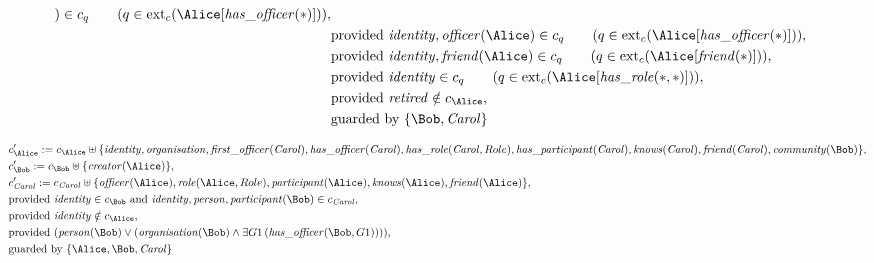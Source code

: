 \begin{align*}
)
 \in c_
q
 \qquad (
q \in 
\mathrm{ext}_c(
\Alice
[
\mathit{\detokenize{
has_officer
}}
(
\ast
)
]
)
)
,\\
&
\text{provided } 
\mathit{\detokenize{
identity
}}
,
\mathit{\detokenize{
officer
}}
(
\Alice
)
 \in c_
q
 \qquad (
q \in 
\mathrm{ext}_c(
\Alice
[
\mathit{\detokenize{
has_officer
}}
(
\ast
)
]
)
)
,\\
&
\text{provided } 
\mathit{\detokenize{
identity
}}
,
\mathit{\detokenize{
friend
}}
(
\Alice
)
 \in c_
q
 \qquad (
q \in 
\mathrm{ext}_c(
\Alice
[
\mathit{\detokenize{
friend
}}
(
\ast
)
]
)
)
,\\
&
\text{provided } 
\mathit{\detokenize{
identity
}}
 \in c_
q
 \qquad (
q \in 
\mathrm{ext}_c(
\Alice
[
\mathit{\detokenize{
has_role
}}
(
\ast
,
\ast
)
]
)
)
,\\
&
\text{provided } 
\mathit{\detokenize{
retired
}}
 \notin c_
{
\Alice
}
,\\
&
\text{guarded by } \{
\Bob
,
\mathit{Carol}
\}
\end{align*}

\begin{align*}
&
c'_
{
\Alice
}
 := 
c_
{
\Alice
}
 \uplus 
\{
\mathit{\detokenize{
identity
}}
,
\mathit{\detokenize{
organisation
}}
,
\mathit{\detokenize{
first_officer
}}
(
\mathit{Carol}
)
,
\mathit{\detokenize{
has_officer
}}
(
\mathit{Carol}
)
,
\mathit{\detokenize{
has_role
}}
(
\mathit{Carol}
,
Role
)
,
\mathit{\detokenize{
has_participant
}}
(
\mathit{Carol}
)
,
\mathit{\detokenize{
knows
}}
(
\mathit{Carol}
)
,
\mathit{\detokenize{
friend
}}
(
\mathit{Carol}
)
,
\mathit{\detokenize{
community
}}
(
\Bob
)
\}
,\\
&
c'_
{
\Bob
}
 := 
c_
{
\Bob
}
 \uplus 
\{
\mathit{\detokenize{
creator
}}
(
\Alice
)
\}
,\\
&
c'_
{
\mathit{Carol}
}
 := 
c_
{
\mathit{Carol}
}
 \uplus 
\{
\mathit{\detokenize{
officer
}}
(
\Alice
)
,
\mathit{\detokenize{
role
}}
(
\Alice
,
Role
)
,
\mathit{\detokenize{
participant
}}
(
\Alice
)
,
\mathit{\detokenize{
knows
}}
(
\Alice
)
,
\mathit{\detokenize{
friend
}}
(
\Alice
)
\}
,\\
&
\text{provided } 
\mathit{\detokenize{
identity
}}
 \in c_
{
\Bob
}
 \text{ and } 
\mathit{\detokenize{
identity
}}
,
\mathit{\detokenize{
person
}}
,
\mathit{\detokenize{
participant
}}
(
\Bob
)
 \in c_
{
\mathit{Carol}
}
,\\
&
\text{provided } 
\mathit{\detokenize{
identity
}}
 \notin c_
{
\Alice
}
,\\
&
\text{provided } 
(
\mathit{\detokenize{
person
}}
(
\Bob
)
\lor
(
\mathit{\detokenize{
organisation
}}
(
\Bob
)
\land
\exists 
G1
\,(
\mathit{\detokenize{
has_officer
}}
(
\Bob
,
G1
)
)
)
)
,\\
&
\text{guarded by } \{
\Alice
,
\Bob
,
\mathit{Carol}
\}
\end{align*}
